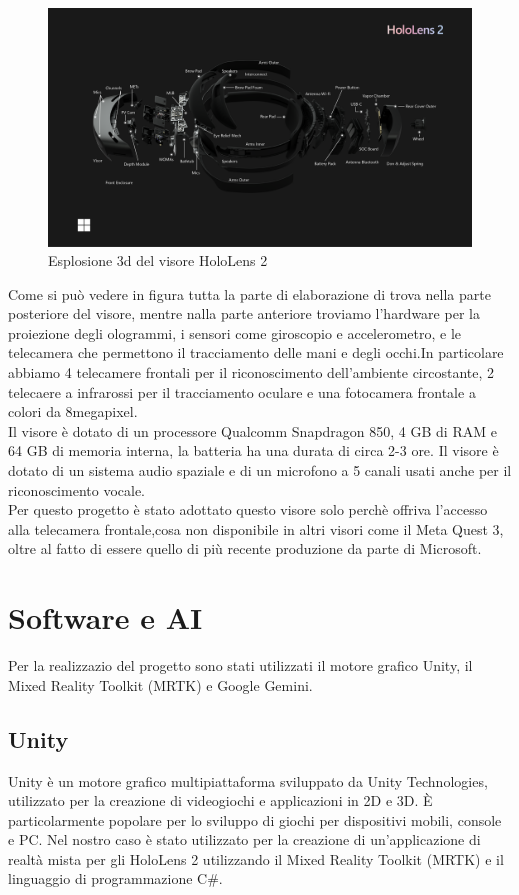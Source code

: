 \begin{figure}[H]
    \includegraphics[width=\textwidth,height=\textheight,keepaspectratio]{figures/chapter_1/hololens2-exploded-view-diagram.png}
    \caption{Esplosione 3d del visore HoloLens 2}
    \centering
\end{figure}
Come si può vedere in figura tutta la parte di elaborazione di trova nella parte posteriore del visore, mentre nalla parte anteriore troviamo l'hardware per la proiezione degli ologrammi, i sensori come giroscopio e accelerometro, e le telecamera che permettono il tracciamento delle mani e degli occhi.In particolare abbiamo 4 telecamere frontali per il riconoscimento dell'ambiente circostante, 2 telecaere a infrarossi per il tracciamento oculare e una fotocamera frontale a colori da 8megapixel.\\
Il visore è dotato di un processore Qualcomm Snapdragon 850, 4 GB di RAM e 64 GB di memoria interna, la batteria ha una durata di circa 2-3 ore. Il visore è dotato di un sistema audio spaziale e di un microfono a 5 canali usati anche per il riconoscimento vocale. \cite{WhatIsHoloLens}\\
Per questo progetto è stato adottato questo visore solo perchè offriva l'accesso alla telecamera frontale,cosa non disponibile in altri visori come il Meta Quest 3, oltre al fatto di essere quello di più recente produzione da parte di Microsoft. 

\section{Software e AI}
Per la realizzazio del progetto sono stati utilizzati il motore grafico Unity, il Mixed Reality Toolkit (MRTK) e Google Gemini.

\subsection{Unity}
Unity è un motore grafico multipiattaforma sviluppato da Unity Technologies, utilizzato per la creazione di videogiochi e applicazioni in 2D e 3D. È particolarmente popolare per lo sviluppo di giochi per dispositivi mobili, console e PC. Nel nostro caso è stato utilizzato per la creazione di un'applicazione di realtà mista per gli HoloLens 2 utilizzando il Mixed Reality Toolkit (MRTK) e il linguaggio di programmazione C\#.
